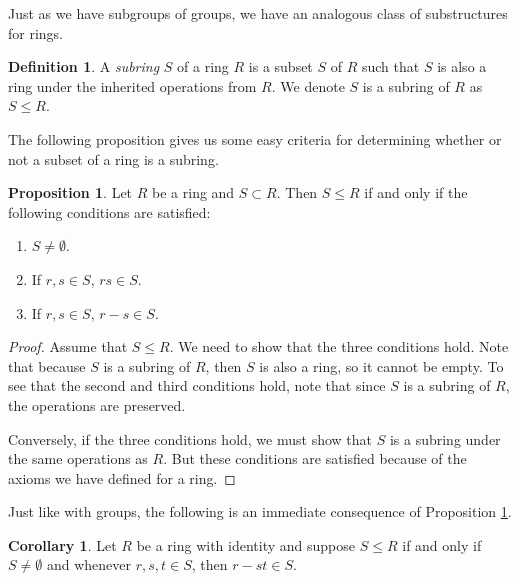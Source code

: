 \documentclass[11pt]{book}
\theoremstyle{definition}\newtheorem{definition}[subsection]{Definition}
\theoremstyle{definition}\newtheorem{example}[subsection]{Example}
\theoremstyle{definition}\newtheorem{notation}[subsection]{Notation}
\theoremstyle{definition}\newtheorem{remark}[subsection]{Remark}
\theoremstyle{theorem}\newtheorem{theorem}[subsection]{Theorem}
\theoremstyle{theorem}\newtheorem{lemma}[subsection]{Lemma}
\theoremstyle{theorem}\newtheorem{proposition}[subsection]{Proposition}
\theoremstyle{theorem}\newtheorem{corollary}[subsection]{Corollary}
\begin{document}
Just as we have subgroups of groups, we have an analogous class of substructures for rings.

\begin{definition}\label{definition:1.1.21}
    A \emph{subring} $S$ of a ring $R$ is a subset $S$ of $R$ such that $S$ is also a ring under the inherited operations from $R$. We denote $S$ is a subring of $R$ as $S \leq R$.
\end{definition}

The following proposition gives us some easy criteria for determining whether or not a subset of a ring is a subring.

\begin{proposition}\label{proposition:1.1.22}
    Let $R$ be a ring and $S \subset R$. Then $S \leq R$ if and only if the following conditions are satisfied:
    \begin{enumerate}
        \item $S \neq \emptyset$.
        \item If $r, s \in S$, $rs \in S$.
        \item If $r, s \in S$, $r - s \in S$.
    \end{enumerate}
\end{proposition}

\begin{proof}
    Assume that $S \leq R$. We need to show that the three conditions hold. Note that because $S$ is a subring of $R$, then $S$ is also a ring, so it cannot be empty. To see that the second and third conditions hold, note that since $S$ is a subring of $R$, the operations are preserved.

    Conversely, if the three conditions hold, we must show that $S$ is a subring under the same operations as $R$. But these conditions are satisfied because of the axioms we have defined for a ring.
\end{proof}

Just like with groups, the following is an immediate consequence of Proposition \ref{proposition:1.1.22}.

\begin{corollary}\label{corollary:1.1.21}
    Let $R$ be a ring with identity and suppose $S \leq R$ if and only if $S \neq \emptyset$ and whenever $r, s, t \in S$, then $r - st \in S$.
\end{corollary}

\end{document}
